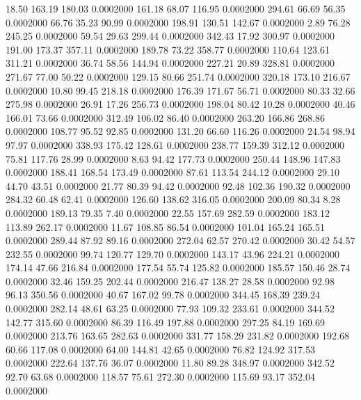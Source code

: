   18.50  163.19  180.03   0.0002000
 161.18   68.07  116.95   0.0002000
 294.61   66.69   56.35   0.0002000
  66.76   35.23   90.99   0.0002000
 198.91  130.51  142.67   0.0002000
   2.89   76.28  245.25   0.0002000
  59.54   29.63  299.44   0.0002000
 342.43   17.92  300.97   0.0002000
 191.00  173.37  357.11   0.0002000
 189.78   73.22  358.77   0.0002000
 110.64  123.61  311.21   0.0002000
  36.74   58.56  144.94   0.0002000
 227.21   20.89  328.81   0.0002000
 271.67   77.00   50.22   0.0002000
 129.15   80.66  251.74   0.0002000
 320.18  173.10  216.67   0.0002000
  10.80   99.45  218.18   0.0002000
 176.39  171.67   56.71   0.0002000
  80.33   32.66  275.98   0.0002000
  26.91   17.26  256.73   0.0002000
 198.04   80.42   10.28   0.0002000
  40.46  166.01   73.66   0.0002000
 312.49  106.02   86.40   0.0002000
 263.20  166.86  268.86   0.0002000
 108.77   95.52   92.85   0.0002000
 131.20   66.60  116.26   0.0002000
  24.54   98.94   97.97   0.0002000
 338.93  175.42  128.61   0.0002000
 238.77  159.39  312.12   0.0002000
  75.81  117.76   28.99   0.0002000
   8.63   94.42  177.73   0.0002000
 250.44  148.96  147.83   0.0002000
 188.41  168.54  173.49   0.0002000
  87.61  113.54  244.12   0.0002000
  29.10   44.70   43.51   0.0002000
  21.77   80.39   94.42   0.0002000
  92.48  102.36  190.32   0.0002000
 284.32   60.48   62.41   0.0002000
 126.60  138.62  316.05   0.0002000
 200.09   80.34    8.28   0.0002000
 189.13   79.35    7.40   0.0002000
  22.55  157.69  282.59   0.0002000
 183.12  113.89  262.17   0.0002000
  11.67  108.85   86.54   0.0002000
 101.04  165.24  165.51   0.0002000
 289.44   87.92   89.16   0.0002000
 272.04   62.57  270.42   0.0002000
  30.42   54.57  232.55   0.0002000
  99.74  120.77  129.70   0.0002000
 143.17   43.96  224.21   0.0002000
 174.14   47.66  216.84   0.0002000
 177.54   55.74  125.82   0.0002000
 185.57  150.46   28.74   0.0002000
  32.46  159.25  202.44   0.0002000
 216.47  138.27   28.58   0.0002000
  92.98   96.13  350.56   0.0002000
  40.67  167.02   99.78   0.0002000
 344.45  168.39  239.24   0.0002000
 282.14   48.61   63.25   0.0002000
  77.93  109.32  233.61   0.0002000
 344.52  142.77  315.60   0.0002000
  86.39  116.49  197.88   0.0002000
 297.25   84.19  169.69   0.0002000
 213.76  163.65  282.63   0.0002000
 331.77  158.29  231.82   0.0002000
 192.68   60.66  117.08   0.0002000
  64.00  144.81   42.65   0.0002000
  76.82  124.92  317.53   0.0002000
 222.64  137.76   36.07   0.0002000
  11.80   89.28  348.97   0.0002000
 342.52   92.70   63.68   0.0002000
 118.57   75.61  272.30   0.0002000
 115.69   93.17  352.04   0.0002000
